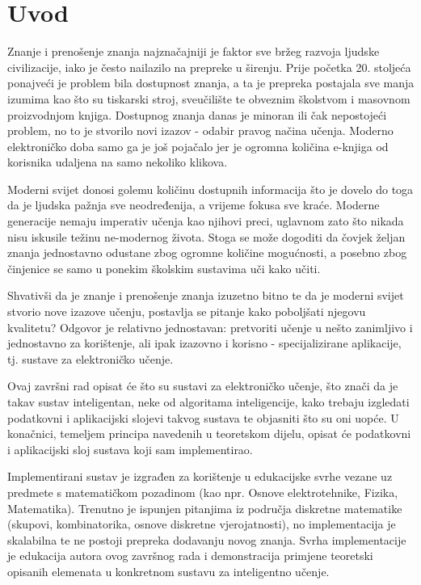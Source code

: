\documentclass[times, utf8, zavrsni, numeric]{fer}
\begin{document}
\chapter{Uvod}
Znanje i prenošenje znanja najznačajniji je faktor sve bržeg razvoja ljudske civilizacije, iako je često nailazilo na prepreke u širenju. Prije početka 20. stoljeća ponajveći je problem bila dostupnost znanja, a ta je prepreka postajala sve manja izumima kao što su tiskarski stroj, sveučilište te obveznim školstvom i masovnom proizvodnjom knjiga. Dostupnog znanja danas je minoran ili čak nepostojeći problem, no to je stvorilo novi izazov - odabir pravog načina učenja. Moderno elektroničko doba samo ga je još pojačalo jer je ogromna količina e-knjiga od korisnika udaljena na samo nekoliko klikova.
\par
Moderni svijet donosi golemu količinu dostupnih informacija što je dovelo do toga da je ljudska pažnja sve neodređenija, a vrijeme fokusa sve kraće. Moderne generacije nemaju imperativ učenja kao njihovi preci, uglavnom zato što nikada nisu iskusile težinu ne-modernog života. Stoga se može dogoditi da čovjek željan znanja jednostavno odustane zbog ogromne količine mogućnosti, a posebno zbog činjenice se samo u ponekim školskim sustavima uči kako učiti.
\par
Shvativši da je znanje i prenošenje znanja izuzetno bitno te da je moderni svijet stvorio nove izazove učenju, postavlja se pitanje kako poboljšati njegovu kvalitetu? Odgovor je relativno jednostavan: pretvoriti učenje u nešto zanimljivo i jednostavno za korištenje, ali ipak izazovno i korisno - specijalizirane aplikacije, tj. sustave za elektroničko učenje.
\par
Ovaj završni rad opisat će što su sustavi za elektroničko učenje, što znači da je takav sustav inteligentan, neke od algoritama inteligencije, kako trebaju izgledati podatkovni i aplikacijski slojevi takvog sustava te objasniti što su oni uopće. U konačnici, temeljem principa navedenih u teoretskom dijelu, opisat će podatkovni i aplikacijski sloj sustava koji sam implementirao.
\par
Implementirani sustav je izgrađen za korištenje u edukacijske svrhe vezane uz predmete s matematičkom pozadinom (kao npr. Osnove elektrotehnike, Fizika, Matematika). Trenutno je ispunjen pitanjima iz područja diskretne matematike (skupovi, kombinatorika, osnove diskretne vjerojatnosti), no implementacija je skalabilna te ne postoji prepreka dodavanju novog znanja. Svrha implementacije je edukacija autora ovog završnog rada i demonstracija primjene teoretski opisanih elemenata u konkretnom sustavu za inteligentno učenje.
\end{document}
